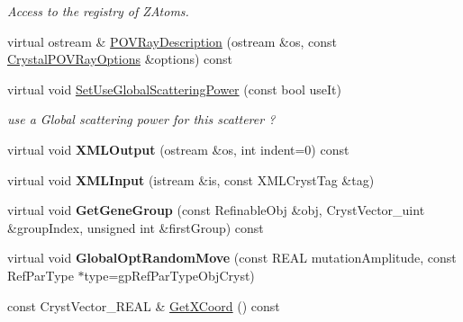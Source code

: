 \begin{DoxyCompactItemize}
\begin{DoxyCompactList}\small\item\em Access to the registry of Z\+Atoms. \end{DoxyCompactList}\item 
virtual ostream \& \mbox{\hyperlink{class_obj_cryst_1_1_z_scatterer_abfce23ff84b572acf371cb9dc8cdb09f}{P\+O\+V\+Ray\+Description}} (ostream \&os, const \mbox{\hyperlink{struct_obj_cryst_1_1_crystal_p_o_v_ray_options}{Crystal\+P\+O\+V\+Ray\+Options}} \&options) const
\item 
virtual void \mbox{\hyperlink{class_obj_cryst_1_1_z_scatterer_afb19ed47922cd08146e1d4ce6a661dd3}{Set\+Use\+Global\+Scattering\+Power}} (const bool use\+It)
\begin{DoxyCompactList}\small\item\em use a Global scattering power for this scatterer ? \end{DoxyCompactList}\item 
\mbox{\label{class_obj_cryst_1_1_z_scatterer_aa077397c5451bf5c91150570963f8dc7}} 
virtual void {\bfseries X\+M\+L\+Output} (ostream \&os, int indent=0) const
\item 
\mbox{\label{class_obj_cryst_1_1_z_scatterer_a8f979a7a06411afb2d2e14566fc0f0aa}} 
virtual void {\bfseries X\+M\+L\+Input} (istream \&is, const X\+M\+L\+Cryst\+Tag \&tag)
\item 
\mbox{\label{class_obj_cryst_1_1_z_scatterer_a9646208d06ff42911fdb0739d6554ede}} 
virtual void {\bfseries Get\+Gene\+Group} (const Refinable\+Obj \&obj, Cryst\+Vector\+\_\+uint \&group\+Index, unsigned int \&first\+Group) const
\item 
\mbox{\label{class_obj_cryst_1_1_z_scatterer_a2212d74d84797d81ced2f67539e59c35}} 
virtual void {\bfseries Global\+Opt\+Random\+Move} (const R\+E\+AL mutation\+Amplitude, const Ref\+Par\+Type $\ast$type=gp\+Ref\+Par\+Type\+Obj\+Cryst)
\item 
\mbox{\label{class_obj_cryst_1_1_z_scatterer_a6d7eeb015d3771ee0be1aa1fdd64de90}} 
const Cryst\+Vector\+\_\+\+R\+E\+AL \& \mbox{\hyperlink{class_obj_cryst_1_1_z_scatterer_a6d7eeb015d3771ee0be1aa1fdd64de90}{Get\+X\+Coord}} () const

\end{DoxyCompactItemize}
